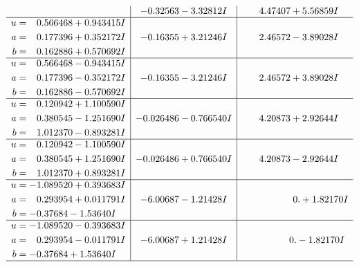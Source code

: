 \documentclass[1p]{elsarticle_modified}
\theoremstyle{definition}
\begin{document}
$$\begin{array}{c|c|c}
 & -0.32563 - 3.32812 I & \phantom{-}4.47407 + 5.56859 I \\ \hline\begin{aligned}
u &= \phantom{-}0.566468 + 0.943415 I \\
a &= \phantom{-}0.177396 + 0.352172 I \\
b &= \phantom{-}0.162886 + 0.570692 I\end{aligned}
 & -0.16355 + 3.21246 I & \phantom{-}2.46572 - 3.89028 I \\ \hline\begin{aligned}
u &= \phantom{-}0.566468 - 0.943415 I \\
a &= \phantom{-}0.177396 - 0.352172 I \\
b &= \phantom{-}0.162886 - 0.570692 I\end{aligned}
 & -0.16355 - 3.21246 I & \phantom{-}2.46572 + 3.89028 I \\ \hline\begin{aligned}
u &= \phantom{-}0.120942 + 1.100590 I \\
a &= \phantom{-}0.380545 - 1.251690 I \\
b &= \phantom{-}1.012370 - 0.893281 I\end{aligned}
 & -0.026486 - 0.766540 I & \phantom{-}4.20873 + 2.92644 I \\ \hline\begin{aligned}
u &= \phantom{-}0.120942 - 1.100590 I \\
a &= \phantom{-}0.380545 + 1.251690 I \\
b &= \phantom{-}1.012370 + 0.893281 I\end{aligned}
 & -0.026486 + 0.766540 I & \phantom{-}4.20873 - 2.92644 I \\ \hline\begin{aligned}
u &= -1.089520 + 0.393683 I \\
a &= \phantom{-}0.293954 + 0.011791 I \\
b &= -0.37684 - 1.53640 I\end{aligned}
 & -6.00687 - 1.21428 I & \phantom{-0.000000 -}0. + 1.82170 I \\ \hline\begin{aligned}
u &= -1.089520 - 0.393683 I \\
a &= \phantom{-}0.293954 - 0.011791 I \\
b &= -0.37684 + 1.53640 I\end{aligned}
 & -6.00687 + 1.21428 I & \phantom{-0.000000 } 0. - 1.82170 I\\
 \hline 
 \end{array}$$\newpage$$\begin{array}{c|c|c}  

\end{array}$$
\end{document}
